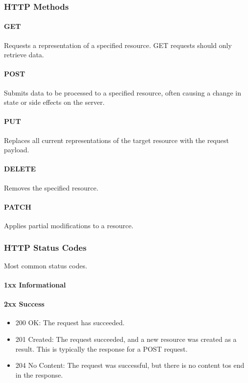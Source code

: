 \documentclass[a4paper]{article}
\begin{document}
        \subsubsection{HTTP Methods}
            \paragraph{GET} Requests a representation of a specified resource. GET requests should only retrieve data.
            \paragraph{POST} Submits data to be processed to a specified resource, often causing a change in state or side effects on the server.
            \paragraph{PUT} Replaces all current representations of the target resource with the request payload.
            \paragraph{DELETE} Removes the specified resource.
            \paragraph{PATCH} Applies partial modifications to a resource.
        \subsubsection{HTTP Status Codes} Most common status codes.
            \paragraph{1xx Informational}
            \paragraph{2xx Success}

            \begin{itemize}
                \item 200 OK: The request has succeeded.
                \item 201 Created: The request succeeded, and a new resource was created as a result. This is typically the response for a POST request.
                \item 204 No Content: The request was successful, but there is no content tos end in the response.
            \end{itemize}
\end{document}
